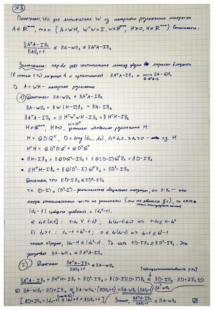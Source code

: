 \documentclass{article}
\begin{document}
	\begin{figure}[h!]
		\includegraphics[width=0.95\linewidth]{handwritten/matcomp_hw1_8}
	\end{figure}
	
\end{document}
